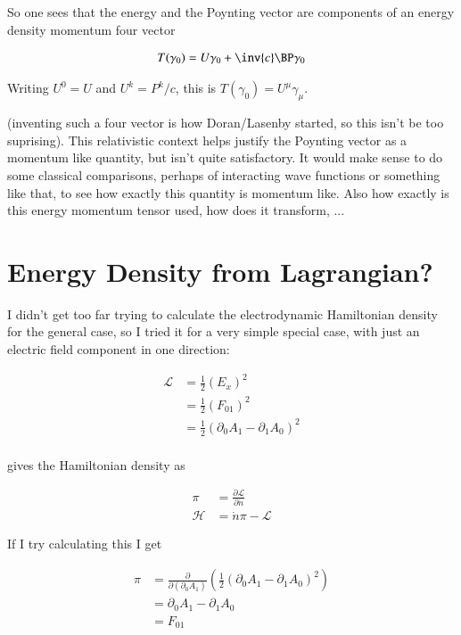 \documentclass{article}
\begin{document}
So one sees that the energy and the Poynting vector are components of an energy density momentum four vector

\begin{align*}
T(\gamma_0) 
&= U \gamma_0 + \inv{c} \BP \gamma_0 \\
\end{align*}

Writing $U^0 = U$ and $U^k = P^k/c$, this is $T(\gamma_0) = U^\mu \gamma_\mu$.

(inventing such a four vector is how Doran/Lasenby started, so this isn't be too suprising).  This
relativistic context helps justify the Poynting vector as a momentum like quantity, but isn't quite
satisfactory.  It would make sense to do some classical comparisons, perhaps of interacting wave functions
or something like that, to see how exactly this quantity is momentum like.  Also how exactly is this energy
momentum tensor used, how does it transform, ...

\section{ Energy Density from Lagrangian? }

I didn't get too far trying to calculate the electrodynamic Hamiltonian density for the general case, so I tried it for a very 
simple special case, with just an electric field component in one direction:

\begin{align*}
\mathcal{L}
&= \frac{1}{2}(E_x)^2 \\
&= \frac{1}{2}(F_{01})^2 \\
&= \frac{1}{2}(\partial_0 A_1 - \partial_1 A_0)^2 \\
\end{align*}

\cite{goldstein1951cm} gives the Hamiltonian density as

\begin{align*}
\pi &= \frac{\partial \mathcal{L}}{\partial \dot{n}} \\
\mathcal{H} &= \dot{n} \pi - \mathcal{L}
\end{align*}

If I try calculating this I get

\begin{align*}
\pi 
&= \frac{\partial}{\partial (\partial_0 A_1)} \left( \frac{1}{2}(\partial_0 A_1 - \partial_1 A_0)^2 \right) \\
&= \partial_0 A_1 - \partial_1 A_0 \\
&= F_{01} \\
\end{align*}
\end{document}
